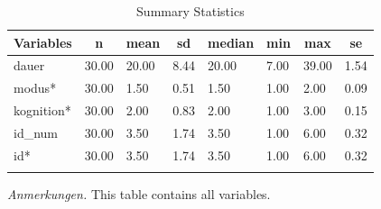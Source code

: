 \documentclass[
  doc,floatsintext]{apa6}
\begin{document}
\begin{table}[tbp]
\begin{center}
\begin{threeparttable}
\end{threeparttable}
\end{center}

\end{table}

\begin{table}[tbp]

\begin{center}
\begin{threeparttable}

\caption{\label{tab:tabsumstat}Summary Statistics}

\begin{tabular}{llllllll}
\toprule
Variables & \multicolumn{1}{c}{n} & \multicolumn{1}{c}{mean} & \multicolumn{1}{c}{sd} & \multicolumn{1}{c}{median} & \multicolumn{1}{c}{min} & \multicolumn{1}{c}{max} & \multicolumn{1}{c}{se}\\
\midrule
dauer & 30.00 & 20.00 & 8.44 & 20.00 & 7.00 & 39.00 & 1.54\\
modus* & 30.00 & 1.50 & 0.51 & 1.50 & 1.00 & 2.00 & 0.09\\
kognition* & 30.00 & 2.00 & 0.83 & 2.00 & 1.00 & 3.00 & 0.15\\
id\_num & 30.00 & 3.50 & 1.74 & 3.50 & 1.00 & 6.00 & 0.32\\
id* & 30.00 & 3.50 & 1.74 & 3.50 & 1.00 & 6.00 & 0.32\\
\bottomrule
\addlinespace
\end{tabular}

\begin{tablenotes}[para]
\normalsize{\textit{Anmerkungen.} This table contains all variables.}
\end{tablenotes}

\end{threeparttable}
\end{center}

\end{table}
\end{document}
